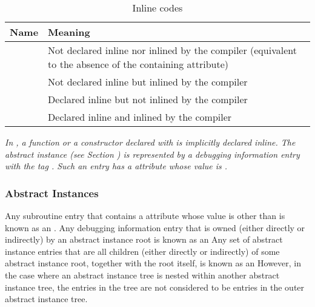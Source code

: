 \begin{table}[ht]
\centering
\caption{Inline codes}
\label{tab:inlinecodes}
\begin{tabular}{l|P{8cm}}
\hline
Name&Meaning\\ \hline
\DWINLnotinlinedTARG{} & Not declared inline nor inlined by the
  \mbox{compiler} (equivalent to the absence of the
  containing \DWATinline{} attribute) \\
\DWINLinlinedTARG{} & Not declared inline but inlined by the \mbox{compiler} \\
\DWINLdeclarednotinlinedTARG{} & Declared inline but 
  not inlined by the \mbox{compiler} \\
\DWINLdeclaredinlinedTARG{} & Declared inline and inlined by the 
  \mbox{compiler} \\
\hline
\end{tabular}
\end{table}

\textit{In , a function or a constructor declared with
 is implicitly declared inline. The abstract
instance (see Section ) 
is represented by a debugging information
entry with the tag \DWTAGsubprogram. Such an entry has a
\DWATinline{} attribute whose value is \DWINLinlined.}

\subsubsection{Abstract Instances}
\label{chap:abstractinstances}
Any subroutine entry that contains a
\DWATinlineDEFN{} attribute 
whose value is other than 
\DWINLnotinlined{}
is known as an .
\hypertarget{chap:DWATinlineabstracttinstance}{}
Any debugging information entry that is owned (either
directly or indirectly) by an abstract instance root
is known as an 
Any set of abstract instance entries that are all
children (either directly or indirectly) of some abstract
instance root, together with the root itself, is known as an
However, in the case where an abstract instance tree is 
nested within another abstract instance tree, the entries in the 
tree are not considered to be entries in the outer abstract
instance tree.

